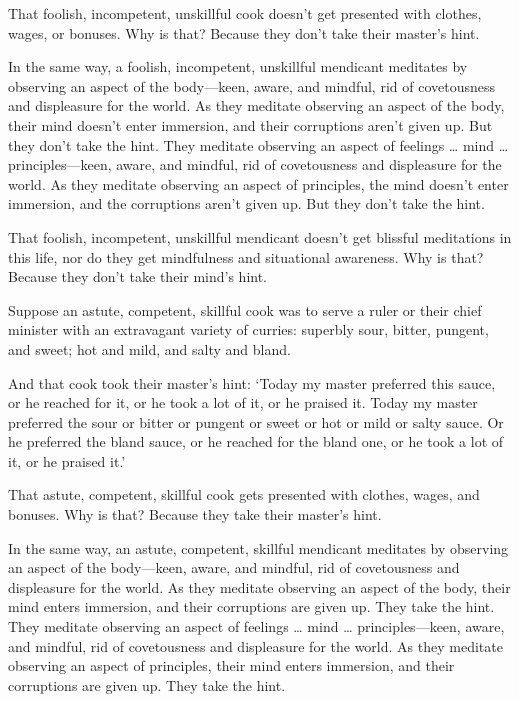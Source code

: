 \documentclass[12pt,openany]{book}%
\begin{document}
That foolish, incompetent, unskillful cook doesn’t get presented with clothes, wages, or bonuses. Why is that? Because they don’t take their master’s hint. 

In the same way, a foolish, incompetent, unskillful mendicant meditates by observing an aspect of the body—keen, aware, and mindful, rid of covetousness and displeasure for the world. As they meditate observing an aspect of the body, their mind doesn’t enter immersion, and their corruptions aren’t given up. But they don’t take the hint. They meditate observing an aspect of feelings … mind … principles—keen, aware, and mindful, rid of covetousness and displeasure for the world. As they meditate observing an aspect of principles, the mind doesn’t enter immersion, and the corruptions aren’t given up. But they don’t take the hint. 

That foolish, incompetent, unskillful mendicant doesn’t get blissful meditations in this life, nor do they get mindfulness and situational awareness. Why is that? Because they don’t take their mind’s hint. 

Suppose an astute, competent, skillful cook was to serve a ruler or their chief minister with an extravagant variety of curries: superbly sour, bitter, pungent, and sweet; hot and mild, and salty and bland. 

And that cook took their master’s hint: ‘Today my master preferred this sauce, or he reached for it, or he took a lot of it, or he praised it. Today my master preferred the sour or bitter or pungent or sweet or hot or mild or salty sauce. Or he preferred the bland sauce, or he reached for the bland one, or he took a lot of it, or he praised it.’ 

That astute, competent, skillful cook gets presented with clothes, wages, and bonuses. Why is that? Because they take their master’s hint. 

In the same way, an astute, competent, skillful mendicant meditates by observing an aspect of the body—keen, aware, and mindful, rid of covetousness and displeasure for the world. As they meditate observing an aspect of the body, their mind enters immersion, and their corruptions are given up. They take the hint. They meditate observing an aspect of feelings … mind … principles—keen, aware, and mindful, rid of covetousness and displeasure for the world. As they meditate observing an aspect of principles, their mind enters immersion, and their corruptions are given up. They take the hint. 
\end{document}
